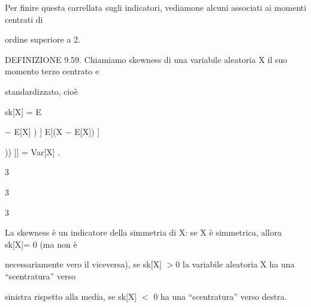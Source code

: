 \documentclass[a4paper,portrait,12pt]{article}
\begin{document}
\begin{flushleft}
Per finire questa carrellata sugli indicatori, vediamone alcuni associati ai momenti centrati di
\end{flushleft}


\begin{flushleft}
ordine superiore a 2.
\end{flushleft}


\begin{flushleft}
DEFINIZIONE 9.59. Chiamiamo skewness di una variabile aleatoria X il suo momento terzo centrato e
\end{flushleft}


\begin{flushleft}
standardizzato, cio\`{e}
\end{flushleft}


\begin{flushleft}
sk[X] = E
\end{flushleft}





\begin{flushleft}
$-$ E[X] ) ] E[(X $-$ E[X]) ]
\end{flushleft}


\begin{flushleft}
[[[((( XVar[X]
\end{flushleft}


\begin{flushleft}
)) ]] = Var[X] .
\end{flushleft}


3





3





3





\begin{flushleft}
La skewness \`{e} un indicatore della simmetria di X: se X \`{e} simmetrica, allora sk[X]= 0 (ma non \`{e}
\end{flushleft}


\begin{flushleft}
necessariamente vero il viceversa), se sk[X] $>$0 la variabile aleatoria X ha una {``}scentratura'' verso
\end{flushleft}


\begin{flushleft}
sinistra rispetto alla media, se sk[X] $<$ 0 ha una {``}scentratura'' verso destra.
\end{flushleft}
\end{document}
